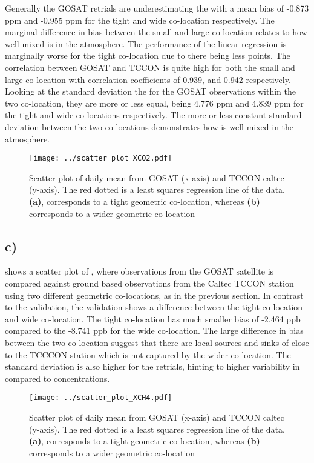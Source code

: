 Generally the GOSAT retrials
are underestimating the  with a mean bias of -0.873 ppm and -0.955 ppm for the
tight and wide co-location respectively. The marginal difference in bias between
the small and large co-location relates to how well mixed  is in the
atmosphere. The performance of the linear
regression is marginally worse for the tight co-location due to there being less
points. The correlation between GOSAT and TCCON is quite high for both the small
and large co-location with correlation coefficients of 0.939, and 0.942
respectively. Looking at the
standard deviation the for the GOSAT observations within the two  co-location, they
are more or less equal, being 4.776 ppm and 4.839 ppm for the tight and wide
co-locations respectively. The more or less constant standard deviation between
the two co-locations demonstrates how  is well mixed in the atmosphere.
\begin{figure}[htbp]
    \centering
    \texttt{[image: ../scatter\_plot\_XCO2.pdf]}
    \caption{Scatter plot of daily mean  from GOSAT (x-axis) and TCCON caltec (y-axis). The red dotted is a least squares regression line of the data. \textbf{(a)}, corresponds to a tight geometric co-location, whereas \textbf{(b)} corresponds to a wider geometric co-location}
    \label{fig:scatter_XCO2}
\end{figure}

\subsection*{c)} 
 shows a scatter plot of , where observations
from the GOSAT satellite is compared against ground based observations from
the Caltec TCCON station using two different geometric co-locations, as in the
previous section. In contrast to the  validation, the 
validation shows a difference between the tight co-location and wide
co-location. The tight 
co-location has much smaller bias of -2.464 ppb compared to the -8.741 ppb for
the wide co-location. The large difference in bias between the two co-location
suggest that there are local sources and sinks of  close to the TCCCON
station which is not captured by the wider co-location. The standard deviation
is also higher for the  retrials, hinting to higher variability in
 compared to  concentrations. 
\begin{figure}
    \centering
    \texttt{[image: ../scatter\_plot\_XCH4.pdf]}
    \caption{Scatter plot of daily mean  from GOSAT (x-axis) and TCCON caltec (y-axis). The red dotted is a least squares regression line of the data. \textbf{(a)}, corresponds to a tight geometric co-location, whereas \textbf{(b)} corresponds to a wider geometric co-location}
    \label{fig:scatter_XCH4}
\end{figure}

